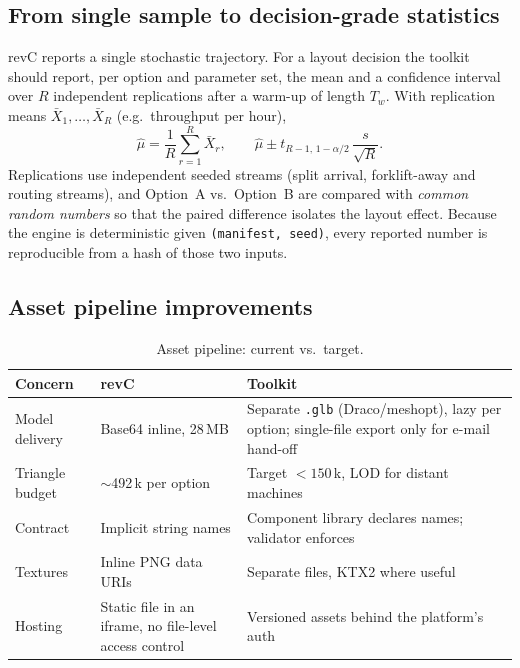\documentclass[11pt,a4paper]{article}
\begin{document}
\subsection{From single sample to decision-grade statistics}

revC reports a single stochastic trajectory. For a layout decision the toolkit should report, per option and
parameter set, the mean and a confidence interval over $R$ independent replications after a warm-up of length $T_w$.
With replication means $\bar{X}_1,\dots,\bar{X}_R$ (e.g.\ throughput per hour),
\[
  \hat{\mu} = \frac{1}{R}\sum_{r=1}^{R}\bar{X}_r,\qquad
  \hat{\mu} \pm t_{R-1,\,1-\alpha/2}\,\frac{s}{\sqrt{R}} .
\]
Replications use independent seeded streams (split arrival, forklift-away and routing streams), and Option~A vs.\ Option~B are compared with
\emph{common random numbers} so that the paired difference isolates the layout effect. Because the engine is deterministic given
\texttt{(manifest, seed)}, every reported number is reproducible from a hash of those two inputs.

\subsection{Asset pipeline improvements}

\begin{table}[H]
\centering\small
\begin{tabularx}{\linewidth}{@{}l X X@{}}
\toprule
\textbf{Concern} & \textbf{revC} & \textbf{Toolkit}\\
\midrule
Model delivery & Base64 inline, 28\,MB & Separate \texttt{.glb} (Draco/meshopt), lazy per option; single-file export only for e-mail hand-off\\
Triangle budget & ${\sim}$492\,k per option & Target $<150$\,k, LOD for distant machines\\
Contract & Implicit string names & Component library declares names; validator enforces\\
Textures & Inline PNG data URIs & Separate files, KTX2 where useful\\
Hosting & Static file in an iframe, no file-level access control & Versioned assets behind the platform's auth\\
\bottomrule
\end{tabularx}
\caption{Asset pipeline: current vs.\ target.}
\end{table}

\end{document}
